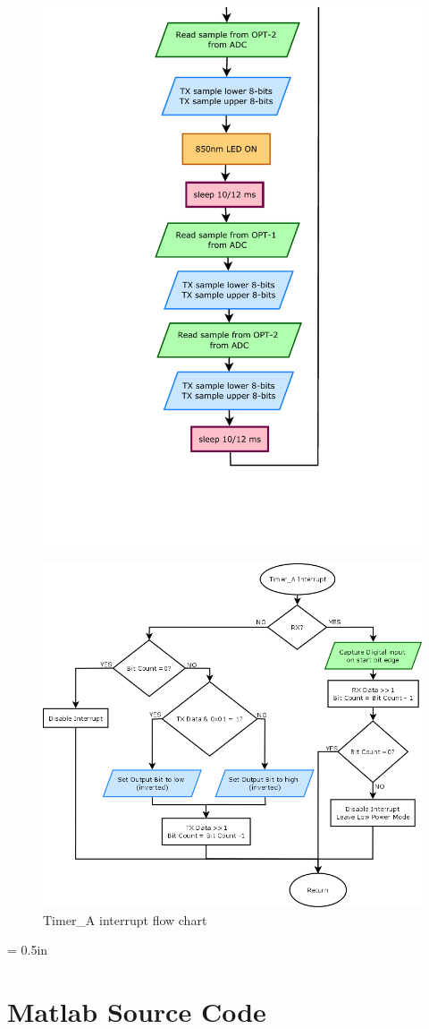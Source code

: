 \begin{figure}[htp]
\centering
\includegraphics{cdia-3.pdf}
\end{figure}

\begin{figure}[htp]
\centering
\includegraphics[width=6in]{cdiatimer.png}
\caption{Timer\_A interrupt flow chart}
\end{figure}

\headsep = 0.5in

\chapter {Matlab Source Code}
